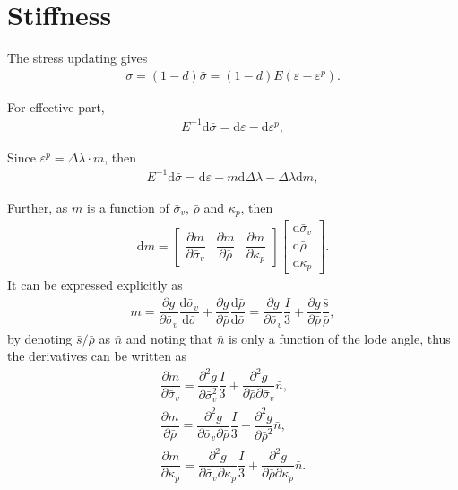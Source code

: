 \documentclass[5p]{elsarticle}
\newcommand*{\md}[1]{\mathrm{d}#1}
\newcommand*{\pdfrac}[2]{\dfrac{\partial#1}{\partial#2}}
\newcommand*{\ddfrac}[2]{\dfrac{\md#1}{\md#2}}
\begin{document}
\section{Stiffness}
The stress updating gives
\begin{gather}
\sigma=\left(1-d\right)\bar{\sigma}=\left(1-d\right)E\left(\varepsilon-\varepsilon^p\right).
\end{gather}

For effective part,
\begin{gather}
E^{-1}\md{\bar{\sigma}}=\md{\varepsilon}-\md{\varepsilon^p},
\end{gather}

Since $\varepsilon^p=\Delta\lambda\cdot{}m$, then
\begin{gather}
E^{-1}\md{\bar{\sigma}}=\md{\varepsilon}-m\md{\Delta\lambda}-\Delta\lambda\md{m},
\end{gather}

Further, as $m$ is a function of $\bar{\sigma}_v$, $\bar{\rho}$ and $\kappa_p$, then
\begin{gather}
\md{m}=\begin{bmatrix}
\pdfrac{m}{\bar{\sigma}_v}&\pdfrac{m}{\bar{\rho}}&\pdfrac{m}{\kappa_p}
\end{bmatrix}\begin{bmatrix}
\md{\bar{\sigma}_v}\\\md{\bar{\rho}}\\\md{\kappa_p}
\end{bmatrix}.
\end{gather}
It can be expressed explicitly as
\begin{gather}
m=\pdfrac{g}{\bar{\sigma}_v}\ddfrac{\bar{\sigma}_v}{\bar{\sigma}}+\pdfrac{g}{\bar{\rho}}\ddfrac{\bar{\rho}}{\bar{\sigma}}=\pdfrac{g}{\bar{\sigma}_v}\dfrac{I}{3}+\pdfrac{g}{\bar{\rho}}\dfrac{\bar{s}}{\bar{\rho}},
\end{gather}
by denoting $\bar{s}/\bar{\rho}$ as $\bar{n}$ and noting that $\bar{n}$ is only a function of the lode angle, thus the derivatives can be written as
\begin{gather}
\pdfrac{m}{\bar{\sigma}_v}=\pdfrac{^2g}{\bar{\sigma}_v^2}\dfrac{I}{3}+\pdfrac{^2g}{\bar{\rho}\partial\bar{\sigma}_v}\bar{n},\\
\pdfrac{m}{\bar{\rho}}=\pdfrac{^2g}{\bar{\sigma}_v\partial\bar{\rho}}\dfrac{I}{3}+\pdfrac{^2g}{\bar{\rho}^2}\bar{n},\\
\pdfrac{m}{\kappa_p}=\pdfrac{^2g}{\bar{\sigma}_v\partial\kappa_p}\dfrac{I}{3}+\pdfrac{^2g}{\bar{\rho}\partial\kappa_p}\bar{n}.
\end{gather}
\end{document}
